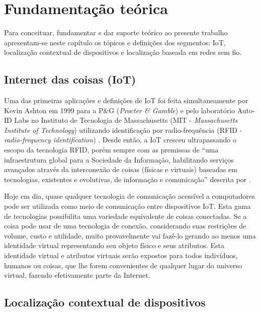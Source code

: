 \chapter{Fundamentação teórica}
\label{chap:fund-teorica}


Para conceituar, fundamentar e dar suporte teórico ao presente trabalho
apresentam-se neste capítulo os tópicos e definições dos segmentos: IoT,
localização contextual de dispositivos e localização baseada em redes sem fio.

\section{Internet das coisas (IoT)}
\label{sec:INTERNET DAS COISAS (IOT)}

Uma das primeiras aplicações e definições de IoT foi feita simultaneamente por
Kevin Ashton em 1999 para a P\&G (\emph{Procter \& Gamble}) \cite{Ashton2009} e
pelo laboratório Auto-ID Labs no Instituto de Tecnologia de Massachusetts (MIT -
\emph{Massachusetts Institute of Technology}) utilizando identificação por
radio-frequência (RFID - \emph{radio-frequency identification})
\cite{ATZORI2010, Friedemann2011}. Desde então, a IoT cresceu ultrapassando o
escopo da tecnologia RFID, porém sempre com as premissas de ``uma infraestrutura
global para a Sociedade da Informação, habilitando serviços avançados através da
interconexão de coisas (físicas e virtuais) baseadas em tecnologias, existentes
e evolutivas, de informação e comunicação'' descrita por .

Hoje em dia, quase qualquer tecnologia de comunicação acessível a computadores
pode ser utilizada como meio de comunicação entre dispositivos IoT. Esta gama de tecnologias possibilita uma
variedade equivalente de coisas conectadas. Se a coisa pode usar de uma
tecnologia de conexão, considerando suas restrições de volume, custo e
utilidade, muito provavelmente vai fazê-lo gerando ao menos uma identidade
virtual representando seu objeto físico e seus atributos. Esta identidade
virtual e atributos virtuais serão expostos para todos indivíduos, humanos ou
coisas, que lhe forem convenientes de qualquer lugar do universo virtual,
fazendo efetivamente parte da Internet.

\section{Localização contextual de dispositivos}
\label{sec:Localização contextual de dispositivos}

